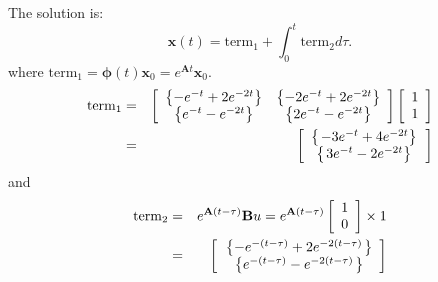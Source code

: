  
The solution is:
\[
\mathbf{x}(t) = \mathrm{term}_1+\int_0^t\mathrm{term}_2 d\tau.
\]
where $\mathrm{term}_1=\mathbf{\phi}(t)\mathbf{x}_0=e^{\mathbf{A}t}\mathbf{x}_0$.
\begin{eqnarray*}
\mathrm{term}_1 & = & \left[ {\begin{array}{*{20}c}
	   \left\{ {-e^{ - t} + 2e^{-2t}} \right\} & \left\{ {-2e^{ - t} + 2e^{-2t}} \right\}  \\
	   \left\{ {e^{ - t} - e^{-2t}} \right\} & \left\{ {2e^{ - t} - e^{-2t}} \right\}  \\
	\end{array}} \right] \left[ {\begin{array}{*{20}c}
	   1  \\
	   1  \\
	\end{array}} \right] \\
	& = & \left[ {\begin{array}{*{20}c}
	   {\left\{ {\left. { - 3e^{ - t}  + 4e^{ - 2t} } \right\}} \right.}  \\
	   {\left\{ {\left. {3e^{ - t}  - 2e^{ - 2t} } \right\}} \right.}  \\
	\end{array}} \right]
\end{eqnarray*}
and
\begin{eqnarray*}
	{\rm{term}}_2  & = & e^{{\bf{A}}(t - \tau )} {\bf{B}}u = e^{{\bf{A}}(t - \tau )} \left[ {\begin{array}{*{20}c}
	   1  \\
	   0  \\
	\end{array}} \right] \times 1 \\
 & = & \left[ {\begin{array}{*{20}c}
   {\left. {\left\{ { - e^{ - (t - \tau )}  + 2e^{ - 2(t - \tau )} } \right.} \right\}}  \\
   {\left. {\left\{ {e^{ - (t - \tau )}  - e^{ - 2(t - \tau )} } \right.} \right\}}  \\
\end{array}} \right]
\end{eqnarray*}

